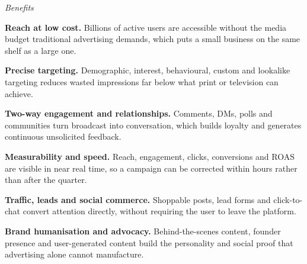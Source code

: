 \begin{qlist}
\textit{Benefits}
\begin{apts}
\item \textbf{Reach at low cost.} Billions of active users are accessible
      without the media budget traditional advertising demands, which puts a
      small business on the same shelf as a large one.
\item \textbf{Precise targeting.} Demographic, interest, behavioural, custom
      and lookalike targeting reduces wasted impressions far below what print
      or television can achieve.
\item \textbf{Two-way engagement and relationships.} Comments, DMs, polls and
      communities turn broadcast into conversation, which builds loyalty and
      generates continuous unsolicited feedback.
\item \textbf{Measurability and speed.} Reach, engagement, clicks, conversions
      and ROAS are visible in near real time, so a campaign can be corrected
      within hours rather than after the quarter.
\item \textbf{Traffic, leads and social commerce.} Shoppable posts, lead forms
      and click-to-chat convert attention directly, without requiring the user
      to leave the platform.
\item \textbf{Brand humanisation and advocacy.} Behind-the-scenes content,
      founder presence and user-generated content build the personality and
      social proof that advertising alone cannot manufacture.
\end{apts}


\end{qlist}
